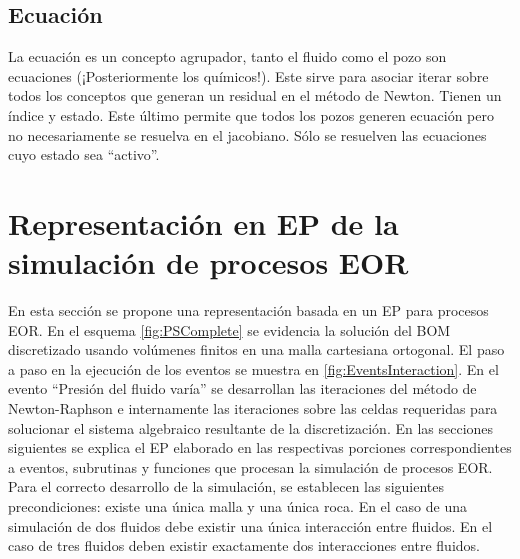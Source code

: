 \subsection{Ecuación}\label{subsec:PS_Equation}
La ecuación es un concepto agrupador, tanto el fluido como el pozo son ecuaciones {\color{red} (¡Posteriormente los químicos!)}. Este sirve para asociar  iterar sobre todos los conceptos que generan un residual en el método de Newton. Tienen un índice y estado. Este último permite que todos los pozos generen ecuación pero no necesariamente se resuelva en el jacobiano. Sólo se resuelven las ecuaciones cuyo estado sea ``activo''.


\section{Representación en EP de la simulación de procesos EOR}\label{subsec:PS_EOR}
En esta sección se propone una representación basada en un EP para procesos EOR. En el esquema \ref{fig:PSComplete} se evidencia la solución del BOM discretizado usando volúmenes finitos en una malla cartesiana ortogonal. El paso a paso en la ejecución de los eventos se muestra en \ref{fig:EventsInteraction}.  En el evento ``Presión del fluido varía'' se desarrollan las iteraciones del método de Newton-Raphson e internamente las iteraciones sobre las celdas requeridas para solucionar el sistema algebraico resultante de la discretización. En las secciones siguientes se explica el EP elaborado en las respectivas porciones correspondientes a eventos, subrutinas y funciones que procesan la simulación de procesos EOR. \\

Para el correcto desarrollo de la simulación, se establecen las siguientes precondiciones: existe una única malla y una única roca. En el caso de una simulación de dos fluidos debe existir una única interacción entre fluidos. En el caso de tres fluidos deben existir exactamente dos interacciones entre fluidos.


